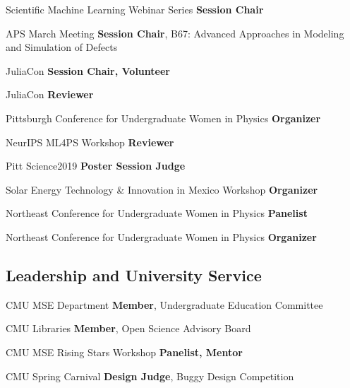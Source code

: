 {Scientific Machine Learning Webinar Series}
{\textbf{Session Chair}}
{}

{APS March Meeting}
{\textbf{Session Chair}, B67: Advanced Approaches in Modeling and Simulation of Defects}
{}

{JuliaCon}
{\textbf{Session Chair, Volunteer}}
{}

{JuliaCon}
{\textbf{Reviewer}}
{}

{Pittsburgh Conference for Undergraduate Women in Physics}
{\textbf{Organizer}}
{}

{NeurIPS ML4PS Workshop}
{\textbf{Reviewer}}
{}

{Pitt Science2019}
{\textbf{Poster Session Judge}}
{}

{Solar Energy Technology \& Innovation in Mexico Workshop}
{\textbf{Organizer}}
{}

{Northeast Conference for Undergraduate Women in Physics}
{\textbf{Panelist}}
{}

{Northeast Conference for Undergraduate Women in Physics}
{\textbf{Organizer}}
{}

\vspace{-2mm}
\subsection{Leadership and University Service}
                      {CMU MSE Department}
                      {\textbf{Member}, Undergraduate Education Committee}
                      {}

                      {CMU Libraries}
                      {\textbf{Member}, Open Science Advisory Board}
                      {}

                      {CMU MSE Rising Stars Workshop}
                      {\textbf{Panelist, Mentor}}
                      {}

                      {CMU Spring Carnival}
                      {\textbf{Design Judge}, Buggy Design Competition}
                      {}


